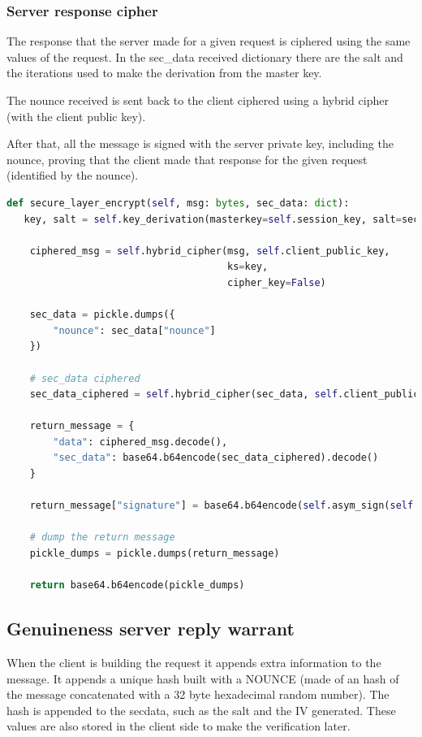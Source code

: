 \documentclass[pdftex,12pt,a4paper]{report}
\begin{document}
\subsubsection{Server response cipher}

The response that the server made for a given request is ciphered using the same values of the request. In the sec\_data received dictionary there are the salt and the iterations used to make the derivation from the master key.

The nounce received is sent back to the client ciphered using a hybrid cipher (with the client public key).

After that, all the message is signed with the server private key, including the nounce, proving that the client made that response for the given request (identified by the nounce).

\begin{lstlisting}[language=Python]
def secure_layer_encrypt(self, msg: bytes, sec_data: dict):
   key, salt = self.key_derivation(masterkey=self.session_key, salt=sec_data["salt"], iterations=sec_data["iterations"])

    ciphered_msg = self.hybrid_cipher(msg, self.client_public_key,
                                      ks=key,
                                      cipher_key=False)

    sec_data = pickle.dumps({
        "nounce": sec_data["nounce"]
    })

    # sec_data ciphered
    sec_data_ciphered = self.hybrid_cipher(sec_data, self.client_public_key)

    return_message = {
        "data": ciphered_msg.decode(),
        "sec_data": base64.b64encode(sec_data_ciphered).decode()
    }

    return_message["signature"] = base64.b64encode(self.asym_sign(self.server_priv_key, json.dumps(return_message).encode())).decode()

    # dump the return message
    pickle_dumps = pickle.dumps(return_message)

    return base64.b64encode(pickle_dumps)
\end{lstlisting}

\subsection{Genuineness server reply warrant}

When the client is building the request it appends extra information to the message. It appends a unique hash built with a NOUNCE (made of an hash of the message concatenated with a 32 byte hexadecimal random number). The hash is appended to the secdata, such as the salt and the IV generated. These values are also stored in the client side to make the verification later.
\end{document}
